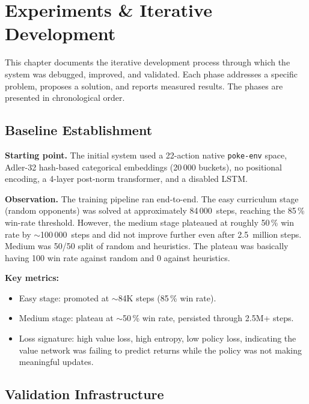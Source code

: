 \chapter{Experiments \& Iterative Development}
\label{ch:experiments}

This chapter documents the iterative development process through which the
system was debugged, improved, and validated.  Each phase addresses a specific
problem, proposes a solution, and reports measured results.  The phases are
presented in chronological order.

\section{Baseline Establishment}

\textbf{Starting point.} The initial system used a 22-action native
\texttt{poke-env} space, Adler-32 hash-based categorical embeddings (20\,000
buckets), no positional encoding, a 4-layer post-norm transformer, and a
disabled LSTM.

\textbf{Observation.} The training pipeline ran end-to-end.  The easy
curriculum stage (random opponents) was solved at approximately 84\,000~steps,
reaching the 85\,\% win-rate threshold.  However, the medium stage plateaued at
roughly 50\,\% win rate by $\sim$100\,000~steps and did not improve further
even after 2.5~million steps. Medium was 50/50 split of random and heuristics. The plateau was basically having 100 win rate against random and 0 against heuristics.

\textbf{Key metrics:}
\begin{itemize}
  \item Easy stage: promoted at $\sim$84K steps (85\,\% win rate).
  \item Medium stage: plateau at $\sim$50\,\% win rate, persisted through 2.5M+ steps.
  \item Loss signature: high value loss, high entropy, low policy loss, indicating
        the value network was failing to predict returns while the policy was not
        making meaningful updates.
\end{itemize}


\section{Validation Infrastructure}

